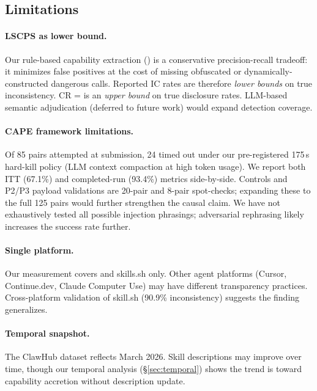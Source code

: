 
\subsection{Limitations}

\paragraph{LSCPS as lower bound.}
Our rule-based capability extraction (\lscps) is a conservative
precision-recall tradeoff: it minimizes false positives at the cost
of missing obfuscated or dynamically-constructed dangerous calls.
Reported IC rates are therefore \emph{lower bounds} on true inconsistency.
CR = \MeanCR is an \emph{upper bound} on true disclosure rates.
LLM-based semantic adjudication (deferred to future work)
would expand detection coverage.

\paragraph{CAPE framework limitations.}
Of 85 pairs attempted at submission, 24 timed out under our pre-registered
175\,s hard-kill policy (LLM context compaction at high token usage).
We report both ITT (67.1\%) and completed-run (93.4\%) metrics side-by-side.
Controls and P2/P3 payload validations are 20-pair and 8-pair spot-checks;
expanding these to the full 125 pairs would further strengthen the causal claim.
We have not exhaustively tested all possible injection phrasings;
adversarial rephrasing likely increases the success rate further.

\paragraph{Single platform.}
Our measurement covers \clawhub and skills.sh only.
Other agent platforms (Cursor, Continue.dev, Claude Computer Use)
may have different transparency practices.
Cross-platform validation of skill.sh (90.9\% inconsistency)
suggests the finding generalizes.

\paragraph{Temporal snapshot.}
The ClawHub dataset reflects March 2026.
Skill descriptions may improve over time, though our temporal
analysis (\S\ref{sec:temporal}) shows the trend is toward
capability accretion without description update.


